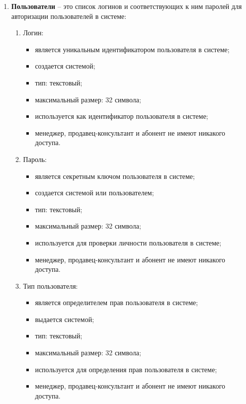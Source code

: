 \begin{enumerate}
    \item \textbf{Пользователи} -- это список логинов и соответствующих к ним паролей для авторизации пользователей в системе:
    \begin{enumerate}
        \item Логин:
        \begin{itemize}
            \item является уникальным идентификатором пользователя в системе;
            \item создается системой;
            \item тип: текстовый;
            \item максимальный размер: 32 символа;
            \item используется как идентификатор пользователя в системе;
            \item менеджер, продавец-консультант и абонент не имеют никакого доступа.
        \end{itemize}

        \item Пароль:
        \begin{itemize}
            \item является секретным ключом пользователя в системе;
            \item создается системой или пользователем;
            \item тип: текстовый;
            \item максимальный размер: 32 символа;
            \item используется для проверки личности пользователя в системе;
            \item менеджер, продавец-консультант и абонент не имеют никакого доступа.
        \end{itemize}

        \item Тип пользователя:
        \begin{itemize}
            \item является определителем прав пользователя в системе;
            \item выдается системой;
            \item тип: текстовый;
            \item максимальный размер: 32 символа;
            \item используется для определения прав пользователя в системе;
            \item менеджер, продавец-консультант и абонент не имеют никакого доступа.
        \end{itemize}
    \end{enumerate}
\end{enumerate}


